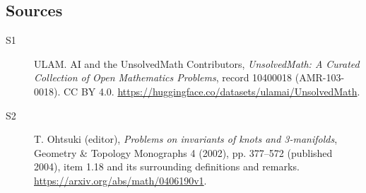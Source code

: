 \documentclass[11pt]{article}
\begin{document}
\subsection{Sources}
\begin{description}
\item[\hypertarget{source:10400018:1}{S1}] ULAM. AI and the UnsolvedMath Contributors, \emph{UnsolvedMath: A Curated Collection of Open Mathematics Problems}, record 10400018 (AMR-103-0018). CC BY 4.0. \url{https://huggingface.co/datasets/ulamai/UnsolvedMath}.
\item[\hypertarget{source:10400018:2}{S2}] T. Ohtsuki (editor), \emph{Problems on invariants of knots and 3-manifolds}, Geometry \& Topology Monographs 4 (2002), pp. 377--572 (published 2004), item 1.18 and its surrounding definitions and remarks. \url{https://arxiv.org/abs/math/0406190v1}.
\end{description}
\label{end:10400018}
\end{document}
